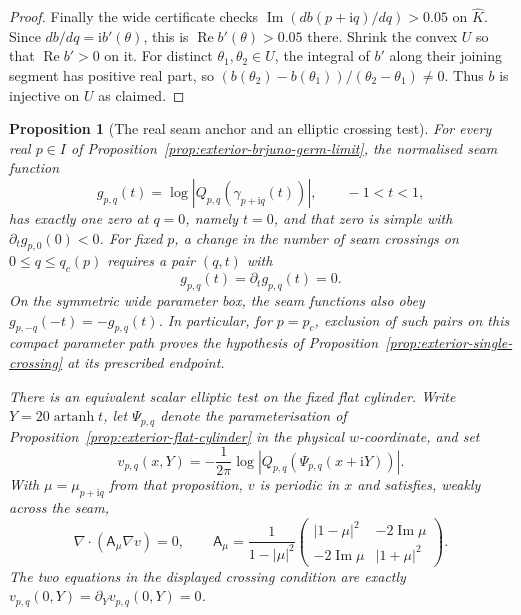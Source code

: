 \documentclass[11pt]{amsart}
\newtheorem{proposition}[theorem]{Proposition}
\theoremstyle{definition}
\newcommand{\ii}{\mathrm{i}}
\begin{document}
\begin{proof}
Finally the wide certificate checks
$\operatorname{Im}(db(p+\ii q)/dq)>0.05$ on $\widehat K$.
Since $db/dq=\ii b'(\theta)$, this is
$\operatorname{Re}b'(\theta)>0.05$ there.  Shrink the convex $U$ so
that $\operatorname{Re}b'>0$ on it.  For distinct
$\theta_1,\theta_2\in U$, the integral of $b'$ along their joining
segment has positive real part, so
$(b(\theta_2)-b(\theta_1))/(\theta_2-\theta_1)\ne0$.
Thus $b$ is injective on $U$ as claimed.
\end{proof}

\begin{proposition}[The real seam anchor and an elliptic crossing test]
\label{prop:exterior-real-seam-anchor}
For every real $p\in I$ of
Proposition~\ref{prop:exterior-brjuno-germ-limit}, the normalised seam
function
\[
 g_{p,q}(t)=\log|Q_{p,q}(\gamma_{p+\ii q}(t))|,
 \qquad -1<t<1,
\]
has exactly one zero at $q=0$, namely $t=0$, and that zero is simple
with $\partial_tg_{p,0}(0)<0$.  For fixed $p$, a change in the number
of seam crossings on $0\le q\le q_c(p)$ requires a pair $(q,t)$
with
\[
 g_{p,q}(t)=\partial_tg_{p,q}(t)=0.
\]
On the symmetric wide parameter box, the seam functions also obey
$g_{p,-q}(-t)=-g_{p,q}(t)$.
In particular, for $p=p_c$, exclusion of such pairs on this compact
parameter path proves the hypothesis of
Proposition~\ref{prop:exterior-single-crossing} at its prescribed
endpoint.

There is an equivalent scalar elliptic test on the fixed flat
cylinder.  Write $Y=20\operatorname{artanh}t$, let $\Psi_{p,q}$
denote the parameterisation of
Proposition~\ref{prop:exterior-flat-cylinder} in the physical
$w$-coordinate, and set
\[
 v_{p,q}(x,Y)=-\frac{1}{2\pi}
  \log|Q_{p,q}(\Psi_{p,q}(x+\ii Y))|.
\]
With $\mu=\mu_{p+\ii q}$ from that proposition, $v$ is periodic in
$x$ and satisfies, weakly across the seam,
\[
 \nabla\!\cdot(\mathsf A_\mu\nabla v)=0,\qquad
 \mathsf A_\mu=
 \frac1{1-|\mu|^2}
 \begin{pmatrix}
 |1-\mu|^2&-2\operatorname{Im}\mu\\
 -2\operatorname{Im}\mu&|1+\mu|^2
 \end{pmatrix}.
\]
The two equations in the displayed crossing condition are exactly
$v_{p,q}(0,Y)=\partial_Yv_{p,q}(0,Y)=0$.
\end{proposition}
\end{document}
